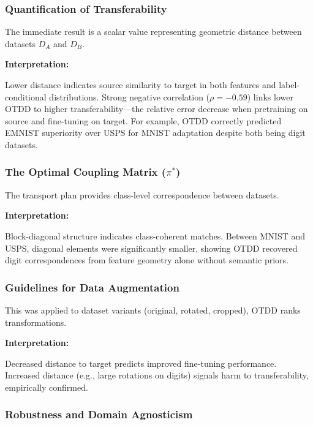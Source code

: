\documentclass[11pt, a4paper]{article}
\theoremstyle{plain} %
\theoremstyle{definition} %
\begin{document}
			\subsubsection{Quantification of Transferability}
			\label{sec:quantification_transferability}
				The immediate result is a scalar value representing geometric distance between datasets $D_A$ and $D_B$.

				\textbf{Interpretation:}

				Lower distance indicates source similarity to target in both features and label-conditional distributions. Strong negative correlation ($\rho = -0.59$) links lower OTDD to higher transferability---the relative error decrease when pretraining on source and fine-tuning on target. For example, OTDD correctly predicted EMNIST superiority over USPS for MNIST adaptation despite both being digit datasets.

			\subsubsection{The Optimal Coupling Matrix ($\pi^*$)}
			\label{sec:optimal_coupling_matrix}
				The transport plan provides class-level correspondence between datasets.

				\textbf{Interpretation:}

				Block-diagonal structure indicates class-coherent matches. Between MNIST and USPS, diagonal elements were significantly smaller, showing OTDD recovered digit correspondences from feature geometry alone without semantic priors.

			\subsubsection{Guidelines for Data Augmentation}
			\label{sec:guidelines_data_augmentation}
				This was applied to dataset variants (original, rotated, cropped), OTDD ranks transformations.

				\textbf{Interpretation:}

				Decreased distance to target predicts improved fine-tuning performance. Increased distance (e.g., large rotations on digits) signals harm to transferability, empirically confirmed.

			\subsubsection{Robustness and Domain Agnosticism}
			\label{sec:robustness_domain_agnosticism}
\end{document}
